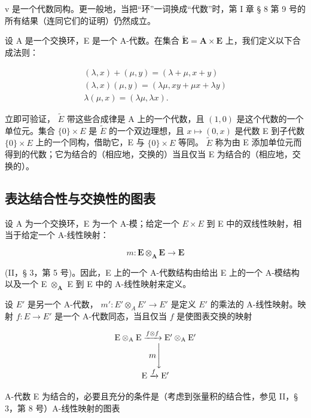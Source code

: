 v 是一个代数同构。更一般地，当把“环”一词换成“代数”时，第 I 章 § 8 第 9 号的所有结果（连同它们的证明）仍然成立。

设 A 是一个交换环，E 是一个 A-代数。在集合 \(\tilde{\mathbf{E}} = \mathbf{A} \times \mathbf{E}\) 上，我们定义以下合成法则：

\[
\begin{array}{r} (\lambda , x) + (\mu , y) = (\lambda + \mu , x + y) \\ (\lambda , x) (\mu , y) = (\lambda \mu , x y + \mu x + \lambda y) \\ \lambda (\mu , x) = (\lambda \mu , \lambda x). \end{array}
\]

立即可验证， \(\tilde{E}\) 带这些合成律是 A 上的一个代数，且 \((1,0)\) 是这个代数的一个单位元。集合 \(\{0\}\times E\) 是 \(\tilde{E}\) 的一个双边理想，且 \(x\mapsto(0,x)\) 是代数 E 到子代数 \(\{0\}\times E\) 上的一个同构，借助它，E 与 \(\{0\}\times E\) 等同。 \(\tilde{E}\) 称为由 E 添加单位元而得到的代数；它为结合的（相应地，交换的）当且仅当 E 为结合的（相应地，交换的）。

\subsection{表达结合性与交换性的图表}

设 A 为一个交换环，E 为一个 A-模；给定一个 \(E \times E\) 到 E 中的双线性映射，相当于给定一个 A-线性映射：

\[
m: \mathbf {E} \otimes_ {\mathbf {A}} \mathbf {E} \rightarrow \mathbf {E}
\]

(II，§ 3，第 5 号)。因此，E 上的一个 A-代数结构由给出 E 上的一个 A-模结构以及一个 E \(\otimes_{\mathbf{A}}\) E 到 E 中的 A-线性映射来定义。

设 \(E'\) 是另一个 A-代数， \(m': E' \otimes_{A} E' \to E'\) 是定义 \(E'\) 的乘法的 A-线性映射。映射 \(f: E \to E'\) 是一个 A-代数同态，当且仅当 \(f\) 是使图表交换的映射

\[
\begin{array}{c} \mathrm{E} \otimes_ {\mathrm{A}} \mathrm{E} \xrightarrow {f \otimes f} \mathrm{E} ^ {\prime} \otimes_ {\mathrm{A}} \mathrm{E} ^ {\prime} \\ m \Biggl \downarrow \\ \mathrm{E} \xrightarrow {f} \mathrm{E} ^ {\prime} \end{array}
\]

A-代数 E 为结合的，必要且充分的条件是（考虑到张量积的结合性，参见 II，§ 3，第 8 号）A-线性映射的图表

